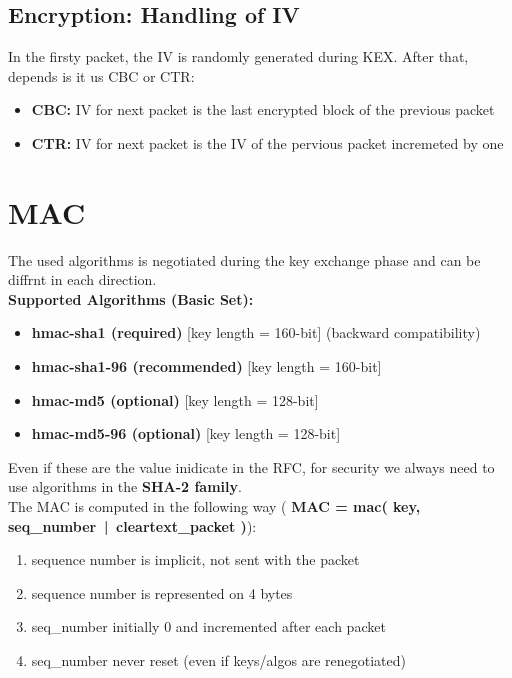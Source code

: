 \subsection{Encryption: Handling of IV}
In the firsty packet, the IV is randomly generated during KEX. After that, depends is it us CBC or CTR:
\begin{itemize}[itemsep=0pt]
    \item \textbf{CBC:} IV for next packet is the last encrypted block of the previous packet
    \item \textbf{CTR:} IV for next packet is the IV of the pervious packet incremeted by one
\end{itemize}


\section{MAC}
The used algorithms is negotiated during the key exchange phase and can be diffrnt in each direction. \\
\textbf{Supported Algorithms (Basic Set):}
\begin{multicols}{2}
        \begin{itemize}[itemsep=0pt]
            \item \textbf{hmac-sha1 (required)} [key length = 160-bit] (backward compatibility)
            \item \textbf{hmac-sha1-96 (recommended)} [key length = 160-bit]
            \item \textbf{hmac-md5 (optional)} [key length = 128-bit]
            \item \textbf{hmac-md5-96 (optional)} [key length = 128-bit]
        \end{itemize}
\end{multicols}

Even if these are the value inidicate in the RFC, for security we always need to use algorithms in the \textbf{SHA-2 family}. \\
The MAC is computed in the following way (\textbf{ MAC = mac( key, seq\_number \,|\, cleartext\_packet )}):
\begin{multicols}{2}
    \begin{enumerate}[itemsep=0pt]
        \item sequence number is implicit, not sent with the packet
        \item sequence number is represented on 4 bytes
        \item seq\_number initially 0 and incremented after each packet
        \item seq\_number never reset (even if keys/algos are renegotiated)
    \end{enumerate}
\end{multicols}

